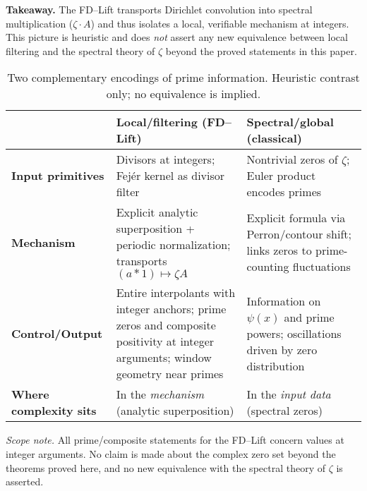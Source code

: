 \documentclass[11pt,a4paper]{amsart}
\theoremstyle{plain}
\theoremstyle{definition}
\theoremstyle{remark}
\begin{document}
\textbf{Takeaway.} The FD–Lift transports Dirichlet convolution into spectral multiplication ($\zeta\cdot A$) and thus isolates a local, verifiable mechanism at integers. This picture is heuristic and does \emph{not} assert any new equivalence between local filtering and the spectral theory of $\zeta$ beyond the proved statements in this paper.

\begin{table}[h]
\centering
\small
\begin{tabular}{@{}p{3.2cm}p{5.1cm}p{5.1cm}@{}}
\toprule
 & \textbf{Local/filtering (FD–Lift)} & \textbf{Spectral/global (classical)} \\
\midrule
\textbf{Input primitives} & Divisors at integers; Fej\'er kernel as divisor filter & Nontrivial zeros of $\zeta$; Euler product encodes primes \\
\textbf{Mechanism} & Explicit analytic superposition + periodic normalization; transports $(a*1)\mapsto \zeta A$ & Explicit formula via Perron/contour shift; links zeros to prime-counting fluctuations \\
\textbf{Control/Output} & Entire interpolants with integer anchors; prime zeros and composite positivity at integer arguments; window geometry near primes & Information on $\psi(x)$ and prime powers; oscillations driven by zero distribution \\
\textbf{Where complexity sits} & In the \emph{mechanism} (analytic superposition) & In the \emph{input data} (spectral zeros) \\
\bottomrule
\end{tabular}
\caption{Two complementary encodings of prime information. Heuristic contrast only; no equivalence is implied.}
\end{table}

\noindent\emph{Scope note.} All prime/composite statements for the FD–Lift concern values at integer arguments. No claim is made about the complex zero set beyond the theorems proved here, and no new equivalence with the spectral theory of $\zeta$ is asserted.
\\
\end{document}

